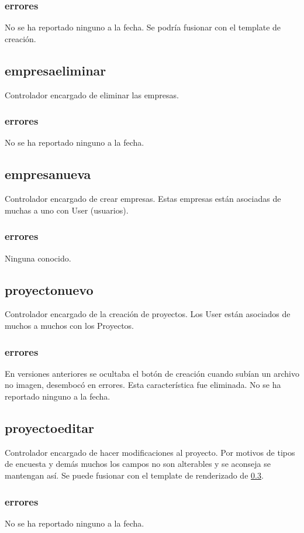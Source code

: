 \documentclass[10pt,a4paper]{book}
\begin{document}
	\subsubsection{errores}
	No se ha reportado ninguno a la fecha. Se podría fusionar con el template de creación.

	\subsection{empresaeliminar}
	Controlador encargado de eliminar las empresas.
	\subsubsection{errores}
	No se ha reportado ninguno a la fecha.

	\subsection{empresanueva}
	Controlador encargado de crear empresas. Estas empresas están asociadas de muchas a uno con User (usuarios).
	\subsubsection{errores}
	Ninguna conocido.


	\subsection{proyectonuevo}\label{proyectonuevo}
	Controlador encargado de la creación de proyectos. Los User están asociados de muchos a muchos con los Proyectos.
	\subsubsection{errores}
	En versiones anteriores se ocultaba el botón de creación cuando subían un archivo no imagen, desembocó en errores. Esta característica fue eliminada. No se ha reportado ninguno a la fecha.

	\subsection{proyectoeditar}
	Controlador encargado de hacer modificaciones al proyecto. Por motivos de tipos de encuesta y demás muchos los campos no son alterables y se aconseja se mantengan así. Se puede fusionar con el template de renderizado de \ref{proyectonuevo}.
	\subsubsection{errores}
	No se ha reportado ninguno a la fecha.
\end{document}
